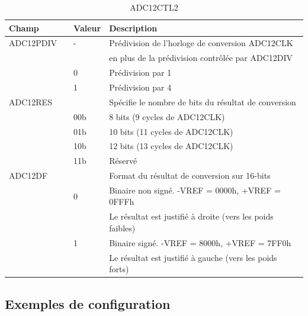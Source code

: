 \begin{table}[H]
\centering 
\begin{tabular}{l l l l}
\hline\hline
Champ & & Valeur & Description \\ %
\hline
ADC12PDIV & & - & Prédivision de l'horloge de conversion ADC12CLK \\
& & & en plus de la prédivision contrôlée par ADC12DIV \\
& & 0 & Prédivision par 1 \\
& & 1 & Prédivision par 4 \\
\hline
ADC12RES & & & Spécifie le nombre de bits du résultat de conversion \\
& & 00b & 8 bits (9 cycles de ADC12CLK) \\
& & 01b & 10 bits (11 cycles de ADC12CLK) \\
& & 10b & 12 bits (13 cycles de ADC12CLK) \\
& & 11b & Réservé \\
\hline
ADC12DF & & & Format du résultat de conversion sur 16-bits \\
& & 0 & Binaire non signé. -VREF = 0000h, +VREF = 0FFFh \\
& & & Le résultat est justifié à droite (vers les poids faibles) \\
& & 1 & Binaire signé. -VREF = 8000h, +VREF = 7FF0h \\
& & & Le résultat est justifié à gauche (vers les poids forts) \\
\hline
\end{tabular}
\caption{ADC12CTL2}
\label{table:ADC12CTL2}
\end{table}

\subsection{Exemples de configuration}

